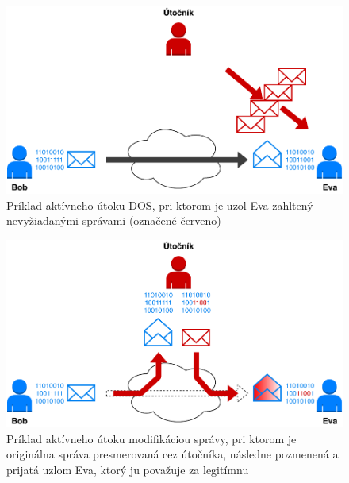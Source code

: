 \begin{figure}[H]
	\begin{center}
		\includegraphics[scale=0.55]{obrazky/active-attack-dos.pdf}
	\end{center}
	\caption[Aktívny útok DOS]{Príklad aktívneho útoku DOS, pri ktorom je uzol Eva zahltený nevyžiadanými správami (označené červeno) \cite{Stallings2011}}
	\label{active-attack-dos}
\end{figure}

\begin{figure}[H]
	\begin{center}
		\includegraphics[scale=0.55]{obrazky/active-attack-mod.pdf}
	\end{center}
	\caption[Aktívny útok modifikácia správy]{Príklad aktívneho útoku modifikáciou správy, pri ktorom je originálna správa presmerovaná cez útočníka, následne pozmenená a prijatá uzlom Eva, ktorý ju považuje za legitímnu \cite{Stallings2011}}
	\label{active-attack-mod}	
\end{figure}

